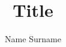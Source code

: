 \documentclass{ctuThesis2}
\author{Name Surname}
\title{Title}
\begin{document}
\frontmatter

\maketitle
% 
% 
% 
% 
%    
% 
% 


%  
%  
\end{document}
